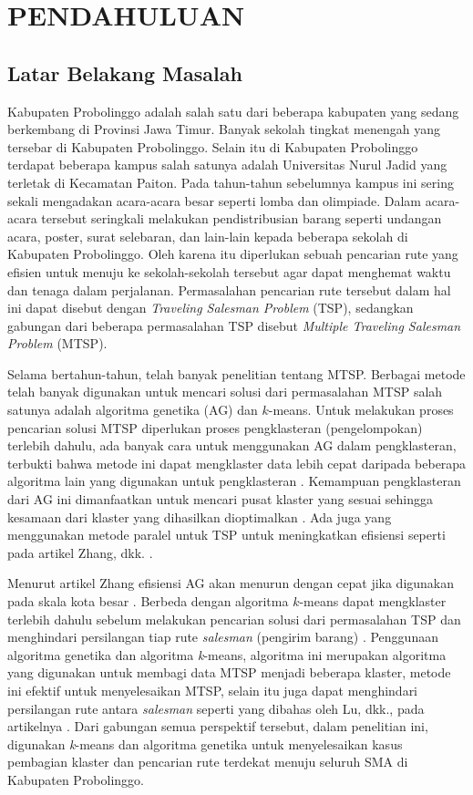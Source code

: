 \chapter{PENDAHULUAN}

\section{Latar Belakang Masalah}

Kabupaten Probolinggo adalah salah satu dari beberapa kabupaten yang sedang berkembang di Provinsi Jawa Timur. Banyak sekolah tingkat menengah yang tersebar di Kabupaten Probolinggo. Selain itu di Kabupaten Probolinggo terdapat beberapa kampus salah satunya adalah Universitas Nurul Jadid yang terletak di Kecamatan Paiton. Pada tahun-tahun sebelumnya kampus ini sering sekali mengadakan acara-acara besar seperti lomba dan olimpiade. Dalam acara-acara tersebut seringkali melakukan pendistribusian barang seperti undangan acara, poster, surat selebaran, dan lain-lain kepada beberapa sekolah di Kabupaten Probolinggo. Oleh karena itu diperlukan sebuah pencarian rute yang efisien untuk menuju ke sekolah-sekolah tersebut agar dapat menghemat waktu dan tenaga dalam perjalanan. Permasalahan pencarian rute tersebut dalam hal ini dapat disebut dengan \textit{Traveling Salesman Problem} (TSP), sedangkan gabungan dari beberapa permasalahan TSP disebut \textit{Multiple Traveling Salesman Problem} (MTSP).

Selama bertahun-tahun, telah banyak penelitian tentang MTSP. Berbagai metode telah banyak digunakan untuk mencari solusi dari permasalahan MTSP salah satunya adalah algoritma genetika (AG) dan $k$-means. Untuk melakukan proses pencarian solusi MTSP diperlukan proses pengklasteran (pengelompokan) terlebih dahulu, ada banyak cara untuk menggunakan AG dalam pengklasteran, terbukti bahwa metode ini dapat mengklaster data lebih cepat daripada beberapa algoritma lain yang digunakan untuk pengklasteran \cite{krishna1999genetic}. Kemampuan pengklasteran dari AG ini dimanfaatkan untuk mencari pusat klaster yang sesuai sehingga kesamaan dari klaster yang dihasilkan dioptimalkan \cite{maii2000genetic}. Ada juga yang menggunakan metode paralel untuk TSP untuk meningkatkan efisiensi seperti pada artikel Zhang, dkk. \cite{li2016parallel}.

Menurut artikel Zhang efisiensi AG akan menurun dengan cepat jika digunakan pada skala kota besar \cite{zhang2014parallel}. Berbeda dengan algoritma $k$-means dapat mengklaster terlebih dahulu sebelum melakukan pencarian solusi dari permasalahan TSP dan menghindari persilangan tiap rute \textit{salesman} (pengirim barang) \cite{inproceedings}. Penggunaan algoritma genetika dan algoritma \textit{k}-means, algoritma ini merupakan algoritma yang digunakan untuk membagi data MTSP menjadi beberapa klaster, metode ini efektif untuk menyelesaikan MTSP, selain itu juga dapat menghindari persilangan rute antara \textit{salesman} seperti yang dibahas oleh Lu, dkk., pada artikelnya \cite{inproceedings}. Dari gabungan semua perspektif tersebut, dalam penelitian ini, digunakan \textit{k}-means dan algoritma genetika untuk menyelesaikan kasus pembagian klaster dan pencarian rute terdekat menuju seluruh SMA di Kabupaten Probolinggo.

